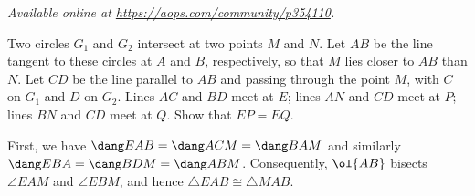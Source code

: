 \textsl{Available online at \url{https://aops.com/community/p354110}.}
\begin{mdframed}[style=mdpurplebox,frametitle={Problem statement}]
Two circles $G_1$ and $G_2$ intersect at two points $M$ and $N$.
Let $AB$ be the line tangent to these circles at $A$ and $B$,
respectively, so that $M$ lies closer to $AB$ than $N$.
Let $CD$ be the line parallel to $AB$
and passing through the point $M$,
with $C$ on $G_1$ and $D$ on $G_2$.
Lines $AC$ and $BD$ meet at $E$; lines $AN$ and $CD$ meet at $P$;
lines $BN$ and $CD$ meet at $Q$.
Show that $EP = EQ$.
\end{mdframed}
First, we have $\dang EAB = \dang ACM = \dang BAM$
and similarly $\dang EBA = \dang BDM = \dang ABM$.
Consequently, $\ol{AB}$ bisects $\angle EAM$ and $\angle EBM$,
and hence $\triangle EAB \cong \triangle MAB$.

